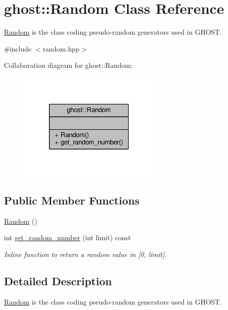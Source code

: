 \hypertarget{classghost_1_1Random}{\section{ghost\-:\-:Random Class Reference}
\label{classghost_1_1Random}
}


\hyperlink{classghost_1_1Random}{Random} is the class coding pseudo-\/random generators used in G\-H\-O\-S\-T.  




{\ttfamily \#include $<$random.\-hpp$>$}



Collaboration diagram for ghost\-:\-:Random\-:\nopagebreak
\begin{figure}[H]
\begin{center}
\leavevmode
\includegraphics[width=198pt]{classghost_1_1Random__coll__graph}
\end{center}
\end{figure}
\subsection*{Public Member Functions}
\begin{DoxyCompactItemize}
\item 
\hyperlink{classghost_1_1Random_a7c45efd1f7c522a68760104ba6084d89}{Random} ()
\item 
int \hyperlink{classghost_1_1Random_acc4f1a79621ed8d77c303cecda571034}{get\-\_\-random\-\_\-number} (int limit) const 
\begin{DoxyCompactList}\small\item\em Inline function to return a random value in \mbox{[}0, limit\mbox{[}. \end{DoxyCompactList}\end{DoxyCompactItemize}


\subsection{Detailed Description}
\hyperlink{classghost_1_1Random}{Random} is the class coding pseudo-\/random generators used in G\-H\-O\-S\-T. 

